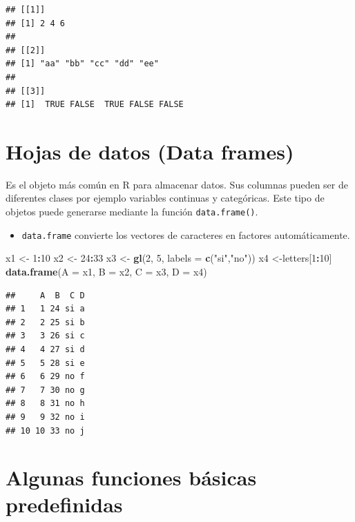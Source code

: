 \documentclass[]{book}
\newenvironment{Shaded}{\begin{snugshade}}{\end{snugshade}}
\newcommand{\KeywordTok}[1]{\textcolor[rgb]{0.13,0.29,0.53}{\textbf{#1}}}
\newcommand{\DataTypeTok}[1]{\textcolor[rgb]{0.13,0.29,0.53}{#1}}
\newcommand{\DecValTok}[1]{\textcolor[rgb]{0.00,0.00,0.81}{#1}}
\newcommand{\StringTok}[1]{\textcolor[rgb]{0.31,0.60,0.02}{#1}}
\newcommand{\OperatorTok}[1]{\textcolor[rgb]{0.81,0.36,0.00}{\textbf{#1}}}
\newcommand{\NormalTok}[1]{#1}
\newenvironment{rmdblock}[1]
{\begin{shaded*}
		\begin{itemize}
			\renewcommand{\labelitemi}{
				\raisebox{-.7\height}[0pt][0pt]{
					{\setkeys{Gin}{width=3em,keepaspectratio}\texttt{[image: images/\#1]}}
				}
			}
			\item
		}
		{
		\end{itemize}
	\end{shaded*}
}
\newenvironment{rmdnote}
{\begin{rmdblock}{note}}
	{\end{rmdblock}}
\begin{document}
\begin{verbatim}
## [[1]]
## [1] 2 4 6
## 
## [[2]]
## [1] "aa" "bb" "cc" "dd" "ee"
## 
## [[3]]
## [1]  TRUE FALSE  TRUE FALSE FALSE
\end{verbatim}

\section{Hojas de datos (Data frames)}\label{hojas-de-datos-data-frames}

Es el objeto más común en R para almacenar datos. Sus columnas pueden
ser de diferentes clases por ejemplo variables continuas y categóricas.
Este tipo de objetos puede generarse mediante la función
\texttt{data.frame()}.

\begin{rmdnote}
\texttt{data.frame} convierte los vectores de caracteres en factores
automáticamente.
\end{rmdnote}

\begin{Shaded}
\begin{Highlighting}[]
\NormalTok{x1 <-}\StringTok{ }\DecValTok{1}\OperatorTok{:}\DecValTok{10}
\NormalTok{x2 <-}\StringTok{ }\DecValTok{24}\OperatorTok{:}\DecValTok{33}
\NormalTok{x3 <-}\StringTok{ }\KeywordTok{gl}\NormalTok{(}\DecValTok{2}\NormalTok{, }\DecValTok{5}\NormalTok{, }\DataTypeTok{labels =} \KeywordTok{c}\NormalTok{(}\StringTok{"si"}\NormalTok{,}\StringTok{"no"}\NormalTok{))}
\NormalTok{x4 <-letters[}\DecValTok{1}\OperatorTok{:}\DecValTok{10}\NormalTok{]}
\KeywordTok{data.frame}\NormalTok{(}\DataTypeTok{A =}\NormalTok{ x1, }\DataTypeTok{B =}\NormalTok{ x2, }\DataTypeTok{C =}\NormalTok{ x3, }\DataTypeTok{D =}\NormalTok{ x4)}
\end{Highlighting}
\end{Shaded}

\begin{verbatim}
##     A  B  C D
## 1   1 24 si a
## 2   2 25 si b
## 3   3 26 si c
## 4   4 27 si d
## 5   5 28 si e
## 6   6 29 no f
## 7   7 30 no g
## 8   8 31 no h
## 9   9 32 no i
## 10 10 33 no j
\end{verbatim}

\section{Algunas funciones básicas
predefinidas}\label{algunas-funciones-basicas-predefinidas}
\end{document}
